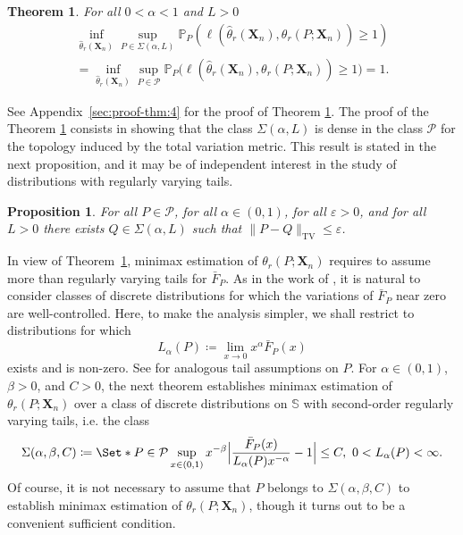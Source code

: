 \documentclass{article}
\newtheorem{theorem}{Theorem}
\newtheorem{proposition}{Proposition}
\newcommand{\1}{\boldsymbol{1}}
\newcommand{\PP}{\mathbb{P}}
\providecommand\given{} %
\theoremstyle{plain}
\begin{document}
\begin{theorem}
  \label{thm:4}
  For all $0 < \alpha < 1$ and $L > 0$
  \begin{multline*}
    \inf_{\hat{\theta}_r(\mathbf{X}_{n})}\sup_{P\in \Sigma(\alpha,L)}\PP_P\left(\ell(\hat{\theta}_r(\mathbf{X}_{n}),\theta_r(P;\mathbf{X}_{n})) \geq 1 \right)\\
    = \inf_{\hat{\theta}_r(\mathbf{X}_{n})}\sup_{P\in \mathcal{P}}\PP_P\Big(\ell(\hat{\theta}_r(\mathbf{X}_{n}),\theta_r(P;\mathbf{X}_{n})) \geq 1 \Big) =1.
  \end{multline*}
\end{theorem}

See Appendix~\ref{sec:proof-thm:4} for the proof of Theorem \ref{thm:4}. The proof of the Theorem \ref{thm:4} consists in showing that the class $\Sigma(\alpha,L)$ is dense in the class $\mathcal{P}$ for the topology induced by the total variation metric. This result is stated in the next proposition, and it may be of independent interest in the study of distributions with regularly varying tails.

\begin{proposition}
  \label{pro:1}
  For all $P \in \mathcal{P}$, for all $\alpha \in (0,1)$, for all $\varepsilon > 0$, and for all $L> 0$ there exists $Q \in \Sigma(\alpha,L)$ such that $\|P - Q\|_{\mathrm{TV}} \leq \varepsilon$.
\end{proposition}

In view of Theorem~\ref{thm:4}, minimax estimation of $\theta_r(P;\mathbf{X}_n)$ requires to assume more than  regularly varying tails for $\bar{F}_P$. As in the work of \cite{Fav(22)}, it is natural to consider classes of discrete distributions for which the variations of $\bar{F}_P$ near zero are well-controlled. Here, to make the analysis simpler, we shall restrict to distributions for which
\begin{displaymath}
  L_{\alpha}(P) \coloneqq \lim_{x\to 0}x^{\alpha}\bar{F}_P(x)  
\end{displaymath}
exists and is non-zero. See \cite{Fav(22)} for analogous tail assumptions on $P$. For $\alpha \in (0,1)$, $\beta > 0$, and $C > 0$,  the next theorem establishes minimax estimation of $\theta_r(P;\mathbf{X}_n)$ over a class of discrete distributions on $\mathbb{S}$ with second-order regularly varying tails, i.e. the class
\begin{displaymath}
  \Sigma(\alpha,\beta,C)%
  \coloneqq%
  \Set*{P \in \mathcal{P} \given \sup_{x \in (0,1)}x^{-\beta}\Big|\frac{\bar{F}_P(x)}{L_{\alpha}(P)x^{-\alpha}} - 1  \Big| \leq C,\ 0 < L_{\alpha}(P) < \infty   }.
\end{displaymath}
Of course, it is not necessary to assume that $P$ belongs to $\Sigma(\alpha,\beta,C)$ to establish minimax estimation of $\theta_r(P;\mathbf{X}_n)$, though it turns out to be a convenient sufficient condition.
\end{document}
